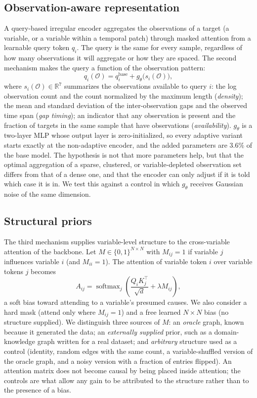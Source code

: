 \documentclass[sigconf,nonacm]{acmart}
\begin{document}
\subsection{Observation-aware representation}
\label{sec:method-adaptive}
A query-based irregular encoder aggregates the observations of a target (a variable, or a variable within a
temporal patch) through masked attention from a learnable query token $q_i$. The query is the same for every
sample, regardless of how many observations it will aggregate or how they are spaced. The second mechanism makes
the query a function of the observation pattern:
\begin{equation}
q_i(\mathcal O)=q_i^{\mathrm{base}}+g_\theta\big(s_i(\mathcal O)\big),
\end{equation}
where $s_i(\mathcal O)\in\mathbb R^7$ summarizes the observations available to query $i$: the log observation
count and the count normalized by the maximum length (\emph{density}); the mean and standard deviation of the
inter-observation gaps and the observed time span (\emph{gap timing}); an indicator that any observation is
present and the fraction of targets in the same sample that have observations (\emph{availability}). $g_\theta$ is
a two-layer MLP whose output layer is zero-initialized, so every adaptive variant starts exactly at the
non-adaptive encoder, and the added parameters are $3.6\%$ of the base model. The hypothesis is not that more
parameters help, but that the optimal aggregation of a sparse, clustered, or variable-depleted observation set
differs from that of a dense one, and that the encoder can only adjust if it is told which case it is in. We test
this against a control in which $g_\theta$ receives Gaussian noise of the same dimension.

\subsection{Structural priors}
\label{sec:method-structure}
The third mechanism supplies variable-level structure to the cross-variable attention of the backbone. Let
$M\in\{0,1\}^{N\times N}$ with $M_{ij}=1$ if variable $j$ influences variable $i$ (and $M_{ii}=1$). The attention
of variable token $i$ over variable tokens $j$ becomes
\begin{equation}
A_{ij}=\operatorname{softmax}_j\!\left(\frac{Q_iK_j^{\top}}{\sqrt d}+\lambda M_{ij}\right),
\end{equation}
a soft bias toward attending to a variable's presumed causes. We also consider a hard mask (attend only where
$M_{ij}=1$) and a free learned $N\times N$ bias (no structure supplied). We distinguish three sources of $M$: an
\emph{oracle} graph, known because it generated the data; an \emph{externally supplied} prior, such as a
domain-knowledge graph written for a real dataset; and \emph{arbitrary} structure used as a control (identity,
random edges with the same count, a variable-shuffled version of the oracle graph, and a noisy version with a
fraction of entries flipped). An attention matrix does not become causal by being placed inside attention; the
controls are what allow any gain to be attributed to the structure rather than to the presence of a bias.
\end{document}
